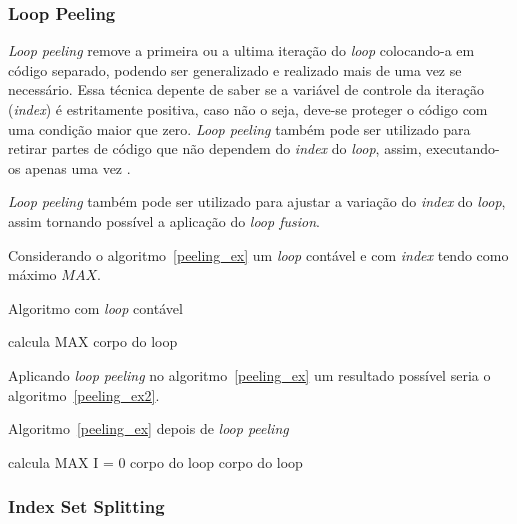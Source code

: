 \subsubsection{Loop Peeling}

\textit{Loop peeling} remove a primeira ou a ultima iteração do \textit{loop} 
colocando-a em código separado, podendo ser generalizado e realizado mais 
de uma vez se necessário. 
Essa técnica depente de saber se a variável de controle da iteração
(\textit{index}) é estritamente positiva, caso não o seja, deve-se proteger 
o código com uma condição maior que zero.
\textit{Loop peeling} também pode ser utilizado para retirar partes de código 
que não dependem do \textit{index} do \textit{loop}, assim, executando-os apenas
uma vez \cite{Song:2004}.

\textit{Loop peeling} também pode ser utilizado para ajustar a variação do 
\textit{index} do \textit{loop}, assim tornando possível a aplicação 
do \textit{loop fusion}.

Considerando o algoritmo~\ref{peeling_ex} um \textit{loop} contável e 
com \textit{index} tendo como máximo $MAX$.

\begin{algorithm}
\caption{Algoritmo com \textit{loop} contável}
\label{peeling_ex}
\begin{algorithmic}[1]

\STATE calcula MAX
\STATE corpo do loop
\ENDFOR

\end{algorithmic}
\end{algorithm}

Aplicando \textit{loop peeling} no algoritmo~\ref{peeling_ex} um resultado
possível seria o algoritmo~\ref{peeling_ex2}.

\begin{algorithm}
\caption{Algoritmo~\ref{peeling_ex} depois de \textit{loop peeling}}
\label{peeling_ex2}
\begin{algorithmic}[1]

\STATE calcula MAX
\STATE I = 0
\STATE corpo do loop
\STATE corpo do loop
\ENDFOR
\ENDIF

\end{algorithmic}
\end{algorithm}


\subsubsection{Index Set Splitting}


